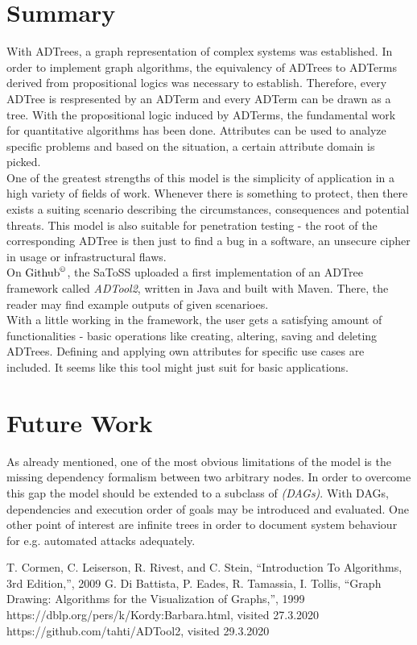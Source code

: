 \documentclass[conference]{IEEEtran}
\begin{document}
\section{Summary}
With ADTrees, a graph representation of complex systems was established. In order to implement graph algorithms, the equivalency of ADTrees to ADTerms derived from propositional logics was necessary to establish. 
Therefore, every ADTree is respresented by an ADTerm and every ADTerm can be drawn as a tree. With the propositional logic induced by ADTerms, the fundamental work for quantitative algorithms has been done. 
Attributes can be used to analyze specific problems and based on the situation, a certain attribute domain is picked. 
\\
One of the greatest strengths of this model is the simplicity of application in a high variety of fields of work. Whenever there is something to protect, then there exists a suiting scenario describing the circumstances, consequences and potential threats. This model is also suitable for penetration testing - the root of the corresponding ADTree is then just to find a bug in a software, an unsecure cipher in usage or infrastructural flaws.\\
On $\text{Github}^\copyright$\cite{github}, the SaToSS uploaded a first implementation of an ADTree framework called \textit{ADTool2}, written in Java and built with Maven. There, the reader may find example outputs of given scenarioes.\\
With a little working in the framework, the user gets a satisfying amount of functionalities - basic operations like creating, altering, saving and deleting ADTrees. Defining and applying own attributes for specific use cases are included. It seems like this tool might just suit for basic applications.
\section{Future Work}
As already mentioned, one  of the most obvious limitations of the model is the missing dependency formalism between two arbitrary nodes. In order to overcome this gap the model should be extended to a subclass of \textit{(DAGs)}. With DAGs, dependencies and execution order of goals may be introduced and evaluated. One other point of interest are infinite trees in order to document system behaviour for e.g. automated attacks adequately.
\begin{thebibliography}{00}
 T. Cormen, C. Leiserson, R. Rivest, and C. Stein, ``Introduction To Algorithms, 3rd Edition,'', 2009
 G. Di Battista, P. Eades, R. Tamassia, I. Tollis, ``Graph Drawing: Algorithms for the Visualization of Graphs,'', 1999
 https://dblp.org/pers/k/Kordy:Barbara.html, visited 27.3.2020
 https://github.com/tahti/ADTool2, visited 29.3.2020
\end{thebibliography}
\end{document}
